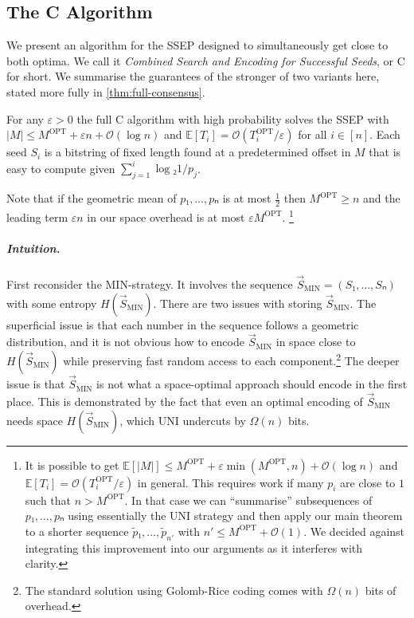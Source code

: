 \documentclass[cleveref,thm-restate]{lipics-v2021}
\def\OPT{\mathrm{OPT}}
\def\Smin{\vec{S}_{\mathrm{MIN}}}
\def\consensus{\texorpdfstring{C\scalebox{0.8}{ONSENSUS}}{CONSENSUS}\xspace}
\begin{document}
\subsection{The \consensus Algorithm}
We present an algorithm for the SSEP designed to simultaneously get close to both optima. We call it \emph{Combined Search and Encoding for Successful Seeds}, or \consensus for short. We summarise the guarantees of the stronger of two variants here, stated more fully in \cref{thm:full-consensus}.
\begin{theorem}
    \label{thm:consise}
    For any $ε > 0$ the full \consensus algorithm with high probability solves the SSEP with $|M| ≤ M^\OPT+εn+𝒪(\log n)$ and $𝔼[T_i] = 𝒪(T_i^\OPT / ε)$ for all $i ∈ [n]$. Each seed $S_i$ is a bitstring of fixed length found at a predetermined offset in $M$ that is easy to compute given $\sum_{j = 1}^{i} \log₂ 1/p_j$.
\end{theorem}
Note that if the geometric mean of $p₁,…,pₙ$ is at most $\frac 12$ then $M^\OPT ≥ n$ and the leading term $εn$ in our space overhead is at most $ε M^\OPT$.%
\footnote{It is possible to get $𝔼[|M|] ≤ M^\OPT+ε\min(M^\OPT,n)+𝒪(\log n)$ and $𝔼[T_i] = 𝒪(T_i^\OPT/ε)$ in general. This requires work if many $p_i$ are close to $1$ such that $n > M^\OPT$. In that case we can “summarise” subsequences of $p₁,…,pₙ$ using essentially the UNI strategy and then apply our main theorem to a shorter sequence $\tilde{p}₁,…,\tilde{p}_{n'}$ with $n' ≤ M^\OPT + 𝒪(1)$. We decided against integrating this improvement into our arguments as it interferes with clarity.}

\subparagraph{Intuition.} First reconsider the MIN-strategy. It involves the sequence $\Smin = (S₁,…,Sₙ)$ with some entropy $H(\Smin)$. There are two issues with storing $\Smin$. The superficial issue is that each number in the sequence follows a geometric distribution, and it is not obvious how to encode $\Smin$ in space close to $H(\Smin)$ while preserving fast random access to each component.\footnote{The standard solution using Golomb-Rice coding \cite{golomb1966run,rice1979some} comes with $Ω(n)$ bits of overhead.}
The deeper issue is that $\Smin$ is not what a space-optimal approach should encode in the first place.
This is demonstrated by the fact that even an optimal encoding of $\Smin$ needs space $H(\Smin)$, which UNI undercuts by $Ω(n)$ bits.
\end{document}

